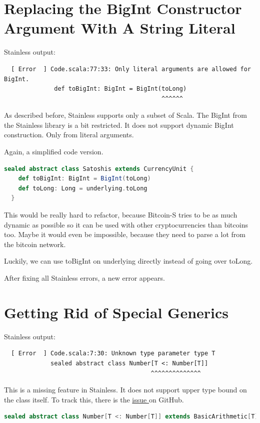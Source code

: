 \section{Replacing the BigInt Constructor Argument With A String Literal}

Stainless output:
{\footnotesize\begin{verbatim}
  [ Error  ] Code.scala:77:33: Only literal arguments are allowed for BigInt.
              def toBigInt: BigInt = BigInt(toLong)
                                            ^^^^^^
\end{verbatim}}

As described before, Stainless supports only a subset of Scala.
The BigInt from the Stainless library is a bit restricted.
It does not support dynamic BigInt construction.
Only from literal arguments.

Again, a simplified code version.
\begin{lstlisting}[language=scala]
  sealed abstract class Satoshis extends CurrencyUnit { 
    def toBigInt: BigInt = BigInt(toLong)
    def toLong: Long = underlying.toLong
  }
\end{lstlisting}

This would be really hard to refactor, because Bitcoin-S tries to be as much dynamic as possible so it can be used with other cryptocurrencies than bitcoins too.
Maybe it would even be impossible, because they need to parse a lot from the bitcoin network.

Luckily, we can use toBigInt on underlying directly instead of going over toLong.

After fixing all Stainless errors, a new error appears.


\section{Getting Rid of Special Generics}

Stainless output:
{\footnotesize\begin{verbatim}
  [ Error  ] Code.scala:7:30: Unknown type parameter type T
             sealed abstract class Number[T <: Number[T]]
                                         ^^^^^^^^^^^^^^
\end{verbatim}}

This is a missing feature in Stainless.
It does not support upper type bound on the class itself.
To track this, there is the \href{https://github.com/epfl-lara/stainless/issues/519}{issue } on GitHub.
\begin{lstlisting}[language=scala]
  sealed abstract class Number[T <: Number[T]] extends BasicArithmetic[T]  
\end{lstlisting}

